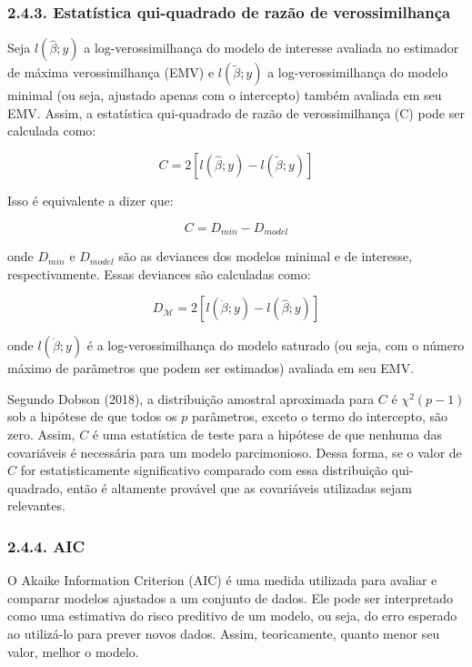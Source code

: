 \documentclass[
]{article}
\begin{document}
\subsubsection{2.4.3. Estatística qui-quadrado de razão de
verossimilhança}\label{estatuxedstica-qui-quadrado-de-razuxe3o-de-verossimilhanuxe7a}

Seja \(l(\hat{\beta}; y)\) a log-verossimilhança do modelo de interesse
avaliada no estimador de máxima verossimilhança (EMV) e
\(l(\tilde{\beta}; y)\) a log-verossimilhança do modelo minimal (ou
seja, ajustado apenas com o intercepto) também avaliada em seu EMV.
Assim, a estatística qui-quadrado de razão de verossimilhança (C) pode
ser calculada como:

\[
C = 2[l(\hat{\beta}; y) - l(\tilde{\beta}; y)]
\]

Isso é equivalente a dizer que:

\[
C = D_{min} - D_{model}
\]

onde \(D_{min}\) e \(D_{model}\) são as deviances dos modelos minimal e
de interesse, respectivamente. Essas deviances são calculadas como:

\[
D_{\mathcal{M}} = 2[l(\dot{\beta}; y) - l(\hat{\beta}; y)]
\]

onde \(l(\dot{\beta}; y)\) é a log-verossimilhança do modelo saturado
(ou seja, com o número máximo de parâmetros que podem ser estimados)
avaliada em seu EMV.

Segundo Dobson (2018), a distribuição amostral aproximada para \(C\) é
\(\chi^2(p-1)\) sob a hipótese de que todos os \(p\) parâmetros, exceto
o termo do intercepto, são zero. Assim, \(C\) é uma estatística de teste
para a hipótese de que nenhuma das covariáveis é necessária para um
modelo parcimonioso. Dessa forma, se o valor de \(C\) for
estatisticamente significativo comparado com essa distribuição
qui-quadrado, então é altamente provável que as covariáveis utilizadas
sejam relevantes.

\subsubsection{2.4.4. AIC}\label{aic}

O Akaike Information Criterion (AIC) é uma medida utilizada para avaliar
e comparar modelos ajustados a um conjunto de dados. Ele pode ser
interpretado como uma estimativa do risco preditivo de um modelo, ou
seja, do erro esperado ao utilizá-lo para prever novos dados. Assim,
teoricamente, quanto menor seu valor, melhor o modelo.
\end{document}
